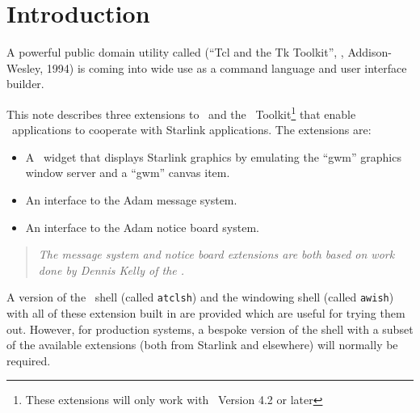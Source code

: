 \stardocabstract
 \newpage
 \begin{latexonly}
   \setlength{\parskip}{0mm}
   \latexonlytoc
   \setlength{\parskip}{\medskipamount}
   \markboth{\stardocname}{\stardocname}
 \end{latexonly}
\cleardoublepage
\renewcommand{\thepage}{\arabic{page}}
\setcounter{page}{1}

\section{\label{introduction}Introduction}

A powerful public domain utility called
 (``Tcl and the Tk
Toolkit'', ,
Addison-Wesley, 1994) is coming into wide use as a command language and
user interface builder.

This note describes three extensions to \Tcl\ and the \Tk\ Toolkit\footnote{
These extensions will only work with \Tk\ Version 4.2 or later} that 
enable \TclTk\ applications to cooperate with Starlink applications. The 
extensions are:

\begin{itemize}
\item A \Tk\ widget that displays Starlink graphics by emulating the ``gwm'' 
graphics window server and a ``gwm'' canvas item.
\item An interface to the Adam message system.
\item An interface to the Adam notice board system.
\end{itemize}

\begin{quote}
{\em The message system and notice board extensions are both based on work 
done by Dennis Kelly of the 
.  }
\end{quote}

A version of the \Tcl\ shell (called {\tt{atclsh}}) and the windowing
shell (called {\tt{awish}}) with all of these extension built in are
provided which are useful for trying them out. However, for production
systems, a bespoke version of the shell with a subset of the available
extensions (both from Starlink and elsewhere) will normally be
required.

